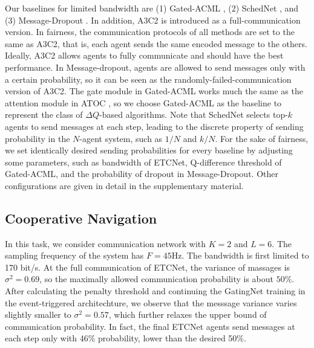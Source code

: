 \documentclass[letterpaper]{article} %
\begin{document}
Our baselines for limited bandwidth are (1) Gated-ACML \cite{pruning}, (2) SchedNet \cite{schednet}, and (3) Message-Dropout \cite{noisy}. In addition, A3C2 \cite{a3c2} is introduced as a full-communication version. In fairness, the communication protocols of all methods are set to the same as A3C2, that is, each agent sends the same encoded message to the others.
Ideally, A3C2 allows agents to fully communicate and should have the best performance. In Message-dropout, agents are allowed to send messages only with a certain probability, so it can be seen as the randomly-failed-communication version of A3C2. The gate module in Gated-ACML works much the same as the attention module in ATOC \cite{atoc}, so we choose Gated-ACML as the baseline to represent the class of $\Delta Q$-based algorithms.
Note that SchedNet selects top-$k$ agents to send messages at each step, leading to the discrete property of sending probability in the $N$-agent system, such as $1/N$ and $k/N$.
For the sake of fairness, we set identically desired sending probabilities for every baseline by adjusting some parameters, such as bandwidth of ETCNet, Q-difference threshold of Gated-ACML, and the probability of dropout in Message-Dropout.
Other configurations are given in detail in the supplementary material.



\subsection{Cooperative Navigation}\label{sec:ng}

In this task, we consider communication network with $K=2$ and $L=6$. The sampling frequency of the system has $F=45$Hz. The bandwidth is first limited to 170 bit/s. At the full communication of ETCNet, the variance of massages is $\sigma^2=0.69$, so the maximally allowed communication probability is about $50\%$. After calculating the penalty threshold and continuing the GatingNet training in the event-triggered architechture, we observe that the messsage variance varies slightly smaller to $\sigma^2=0.57$, which further relaxes the upper bound of communication probability. In fact, the final ETCNet agents send messages at each step only with 46\% probability, lower than the desired 50\%.
\end{document}
